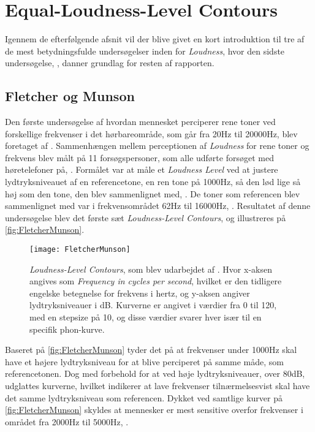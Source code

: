 \section{Equal-Loudness-Level Contours}
\label{Equal-loudness-level-contours}
Igennem de efterfølgende afsnit vil der blive givet en kort introduktion til tre af de mest betydningsfulde undersøgelser inden for \textit{Loudness}, hvor den sidste undersøgelse, \textcite{STD:ISO226}, danner grundlag for resten af rapporten. 
%
\subsection{Fletcher og Munson}
\label{Fletcher-Munson}
%
Den første undersøgelse af hvordan mennesket perciperer rene toner ved forskellige frekvenser i det hørbareområde, som går fra 20Hz til 20000Hz, blev foretaget af \textcite{PDF:FletcherMunson}. Sammenhængen mellem perceptionen af \textit{Loudness} for rene toner og frekvens blev målt på 11 forsøgspersoner, som alle udførte forsøget med høretelefoner på, \parencite[s. 86]{PDF:FletcherMunson}. Formålet var at måle et \textit{Loudness Level} ved at justere lydtryksniveauet af en referencetone, en ren tone på 1000Hz, så den lød lige så høj som den tone, den blev sammenlignet med, \parencite[s. 84]{PDF:FletcherMunson}. De toner som referencen blev sammenlignet med var i frekvensområdet 62Hz til 16000Hz, \parencite[s. 88]{PDF:FletcherMunson}. Resultatet af denne undersøgelse blev det første sæt \textit{Loudness-Level Contours}, og illustreres på \autoref{fig:FletcherMunson}.
%
\begin{figure}[H]
	\centering
	\texttt{[image: FletcherMunson]}
	\caption{\textit{Loudness-Level Contours}, som blev udarbejdet af \textcite[s. 91]{PDF:FletcherMunson}. Hvor x-aksen angives som \textit{Frequency in cycles per second}, hvilket er den tidligere engelske betegnelse for frekvens i hertz, og y-aksen angiver lydtryksniveauer i dB.  Kurverne er angivet i værdier fra 0 til 120, med en stepsize på 10, og disse værdier svarer hver især til en specifik phon-kurve.}
	\label{fig:FletcherMunson}
\end{figure}
\noindent
%
Baseret på \autoref{fig:FletcherMunson} tyder det på at frekvenser under 1000Hz skal have et højere lydtryksniveau for at blive perciperet på samme måde, som referencetonen. Dog med forbehold for at ved høje lydtryksniveauer, over 80dB, udglattes kurverne, hvilket indikerer at lave frekvenser tilnærmelsesvist skal have det samme lydtryksniveau som referencen. Dykket ved samtlige kurver på \autoref{fig:FletcherMunson} skyldes at mennesker er mest sensitive overfor frekvenser i området fra 2000Hz til 5000Hz, \parencite{WEB:HowLoudIsTooLoud}.
